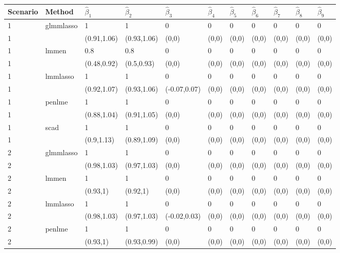 \begin{table}[ht]
\centering
\begin{tabular}{lllllllllll}
  \hline
Scenario & Method & $\hat{\beta}_{1}$ & $\hat{\beta}_{2}$ & $\hat{\beta}_{3}$ & $\hat{\beta}_{4}$ & $\hat{\beta}_{5}$ & $\hat{\beta}_{6}$ & $\hat{\beta}_{7}$ & $\hat{\beta}_{8}$ & $\hat{\beta}_{9}$ \\ 
  \hline
1 & \multirow{2}{*}{glmmlasso} & 1 & 1 & 0 & 0 & 0 & 0 & 0 & 0 & 0 \\ 
  1 &  & (0.91,1.06) & (0.93,1.06) & (0,0) & (0,0) & (0,0) & (0,0) & (0,0) & (0,0) & (0,0) \\ 
  1 & \multirow{2}{*}{lmmen} & 0.8 & 0.8 & 0 & 0 & 0 & 0 & 0 & 0 & 0 \\ 
  1 &  & (0.48,0.92) & (0.5,0.93) & (0,0) & (0,0) & (0,0) & (0,0) & (0,0) & (0,0) & (0,0) \\ 
  1 & \multirow{2}{*}{lmmlasso} & 1 & 1 & 0 & 0 & 0 & 0 & 0 & 0 & 0 \\ 
  1 &  & (0.92,1.07) & (0.93,1.06) & (-0.07,0.07) & (0,0) & (0,0) & (0,0) & (0,0) & (0,0) & (0,0) \\ 
  1 & \multirow{2}{*}{penlme} & 1 & 1 & 0 & 0 & 0 & 0 & 0 & 0 & 0 \\ 
  1 &  & (0.88,1.04) & (0.91,1.05) & (0,0) & (0,0) & (0,0) & (0,0) & (0,0) & (0,0) & (0,0) \\ 
  1 & \multirow{2}{*}{scad} & 1 & 1 & 0 & 0 & 0 & 0 & 0 & 0 & 0 \\ 
  1 &  & (0.9,1.13) & (0.89,1.09) & (0,0) & (0,0) & (0,0) & (0,0) & (0,0) & (0,0) & (0,0) \\ 
  2 & \multirow{2}{*}{glmmlasso} & 1 & 1 & 0 & 0 & 0 & 0 & 0 & 0 & 0 \\ 
  2 &  & (0.98,1.03) & (0.97,1.03) & (0,0) & (0,0) & (0,0) & (0,0) & (0,0) & (0,0) & (0,0) \\ 
  2 & \multirow{2}{*}{lmmen} & 1 & 1 & 0 & 0 & 0 & 0 & 0 & 0 & 0 \\ 
  2 &  & (0.93,1) & (0.92,1) & (0,0) & (0,0) & (0,0) & (0,0) & (0,0) & (0,0) & (0,0) \\ 
  2 & \multirow{2}{*}{lmmlasso} & 1 & 1 & 0 & 0 & 0 & 0 & 0 & 0 & 0 \\ 
  2 &  & (0.98,1.03) & (0.97,1.03) & (-0.02,0.03) & (0,0) & (0,0) & (0,0) & (0,0) & (0,0) & (0,0) \\ 
  2 & \multirow{2}{*}{penlme} & 1 & 1 & 0 & 0 & 0 & 0 & 0 & 0 & 0 \\ 
  2 &  & (0.93,1) & (0.93,0.99) & (0,0) & (0,0) & (0,0) & (0,0) & (0,0) & (0,0) & (0,0) \\ 

\end{tabular}
\end{table}
